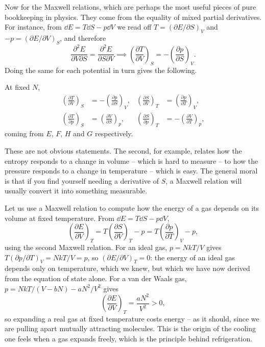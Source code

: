 Now for the Maxwell relations, which are perhaps the most useful pieces of pure bookkeeping in physics. They come from the equality of mixed partial derivatives. For instance, from $\dd E = T\dd S - p\dd V$ we read off $T = (\partial E/\partial S)_V$ and $-p = (\partial E/\partial V)_S$, and therefore
$$
\frac{\partial^2 E}{\partial V\partial S} = \frac{\partial^2 E}{\partial S\partial V} \implies \left(\frac{\partial T}{\partial V}\right)_S = -\left(\frac{\partial p}{\partial S}\right)_V.
$$
Doing the same for each potential in turn gives the following.

\begin{proposition}
	At fixed $N$,
	\begin{align*}
		\left(\frac{\partial T}{\partial V}\right)_S &= -\left(\frac{\partial p}{\partial S}\right)_V, &
		\left(\frac{\partial S}{\partial V}\right)_T &= \left(\frac{\partial p}{\partial T}\right)_V,\\
		\left(\frac{\partial T}{\partial p}\right)_S &= \left(\frac{\partial V}{\partial S}\right)_p, &
		\left(\frac{\partial S}{\partial p}\right)_T &= -\left(\frac{\partial V}{\partial T}\right)_p,
	\end{align*}
	coming from $E$, $F$, $H$ and $G$ respectively.
\end{proposition}

These are not obvious statements. The second, for example, relates how the entropy responds to a change in volume -- which is hard to measure -- to how the pressure responds to a change in temperature -- which is easy. The general moral is that if you find yourself needing a derivative of $S$, a Maxwell relation will usually convert it into something measurable.

\begin{example}
	Let us use a Maxwell relation to compute how the energy of a gas depends on its volume at fixed temperature. From $\dd E = T\dd S - p\dd V$,
	$$
	\left(\frac{\partial E}{\partial V}\right)_T = T\left(\frac{\partial S}{\partial V}\right)_T - p = T\left(\frac{\partial p}{\partial T}\right)_V - p,
	$$
	using the second Maxwell relation. For an ideal gas, $p = NkT/V$ gives $T(\partial p/\partial T)_V = NkT/V = p$, so $(\partial E/\partial V)_T = 0$: the energy of an ideal gas depends only on temperature, which we knew, but which we have now derived from the equation of state alone. For a van der Waals gas, $p = NkT/(V-bN) - aN^2/V^2$ gives
	$$
	\left(\frac{\partial E}{\partial V}\right)_T = \frac{aN^2}{V^2} > 0,
	$$
	so expanding a real gas at fixed temperature costs energy -- as it should, since we are pulling apart mutually attracting molecules. This is the origin of the cooling one feels when a gas expands freely, which is the principle behind refrigeration.
\end{example}

